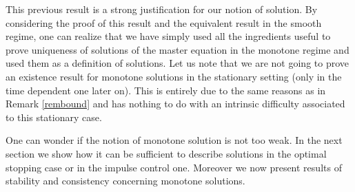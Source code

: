 \documentclass[10pt]{amsart}
\theoremstyle{definition}
\begin{document}
This previous result is a strong justification for our notion of solution. By considering the proof of this result and the equivalent result in the smooth regime, one can realize that we have simply used all the ingredients useful to prove uniqueness of solutions of the master equation in the monotone regime and used them as a definition of solutions. Let us note that we are not going to prove an existence result for monotone solutions in the stationary setting (only in the time dependent one later on). This is entirely due to the same reasons as in Remark \ref{rembound} and has nothing to do with an intrinsic difficulty associated to this stationary case.

One can wonder if the notion of monotone solution is not too weak. In the next section we show how it can be sufficient to describe solutions in the optimal stopping case or in the impulse control one. Moreover we now present results of stability and consistency concerning monotone solutions.
\end{document}
